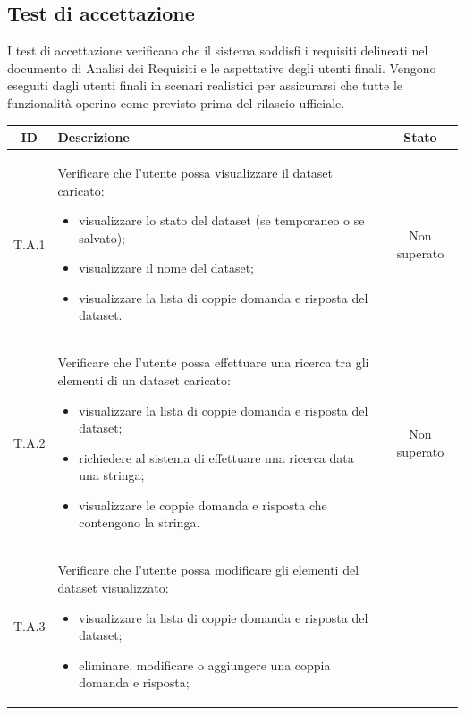 \subsection{Test di accettazione}
\label{subsec:test_accettazione}
I test di accettazione verificano che il sistema soddisfi i requisiti delineati nel documento di Analisi dei Requisiti e le aspettative degli utenti finali.
Vengono eseguiti dagli utenti finali in scenari realistici per assicurarsi che tutte le funzionalità operino come previsto prima del rilascio ufficiale.

\begin{tabularx}{\textwidth}{|c|X|c|}
    \hline
    \textbf{ID} & \textbf{Descrizione} & \textbf{Stato}\\
    \hline
    \label{ta:ta1}T.A.1 & Verificare che l'utente possa visualizzare il dataset caricato:
                        \begin{itemize}
                            \item visualizzare lo stato del dataset (se temporaneo o se salvato);
                            \item visualizzare il nome del dataset;
                            \item visualizzare la lista di coppie domanda e risposta del dataset.
                        \end{itemize} & Non superato\\ %
    \hline
    \label{ta:ta2}T.A.2 & Verificare che l'utente possa effettuare una ricerca tra gli elementi di un dataset caricato:
                        \begin{itemize}
                            \item visualizzare la lista di coppie domanda e risposta del dataset;
                            \item richiedere al sistema di effettuare una ricerca data una stringa;
                            \item visualizzare le coppie domanda e risposta che contengono la stringa.
                        \end{itemize} & Non superato\\%
    \hline
    \label{ta:ta3}T.A.3 & Verificare che l'utente possa modificare gli elementi del dataset visualizzato:
                        \begin{itemize}
                            \item visualizzare la lista di coppie domanda e risposta del dataset;
                            \item eliminare, modificare o aggiungere una coppia domanda e risposta;

\end{itemize}
\end{tabularx}
